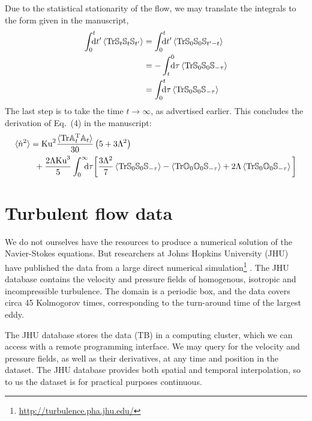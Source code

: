 \documentclass[thesis.tex]{subfiles}
\begin{document}
Due to the statistical stationarity of the flow, we may translate the integrals to the form given in the manuscript, 
\begin{align*}
	\int_0^{t}\!\!\!\!{\rm d}t'\left\langle\tr \ma S_t\ma S_{t}\ma S_{t'}\right\rangle 
	&= \int_0^{t}\!\!\!\!{\rm d}t'\left\langle\tr \ma S_0\ma S_{0}\ma S_{t'-t}\right\rangle \\
	&= -\int_t^{0}\!\!\!\!{\rm d}\tau\left\langle\tr \ma S_0\ma S_{0}\ma S_{-\tau}\right\rangle \\
	&= \int_0^{t}\!\!\!\!{\rm d}\tau\left\langle\tr \ma S_0\ma S_{0}\ma S_{-\tau}\right\rangle
\end{align*}
The last step is to take the time $t\to\infty$, as advertised earlier. This concludes the derivation of Eq.~(4) in the manuscript:
\begin{align}
\langle \dot n^2\rangle &=\ku^2\frac{\langle\tr\ma A_t\transpose \ma A_t\rangle}{30}\left(5 + 3 \Lambda^2\right) \nn \\
	&\,\,\,+ \frac{2 \Lambda\ku^3}{5} \int_0^{\infty}\!\!\!\!{\rm d}\tau \bigg[\frac{3 \Lambda^2}{7}\left\langle\tr \ma S_0\ma S_{0}\ma S_{-\tau}\right\rangle - \left\langle\tr \ma O_0\ma O_{0}\ma S_{-\tau}\right\rangle + 2 \Lambda\left\langle\tr \ma S_0\ma O_{0}\ma S_{-\tau}\right\rangle\bigg]\eqnlab{eq4final}
\end{align}


\section{Turbulent flow data}

We do not ourselves have the resources to produce a numerical solution of the Navier-Stokes equations. But researchers at Johns Hopkins University (JHU) have published the data from a large direct numerical simulation\footnote{\url{http://turbulence.pha.jhu.edu/}} \cite{li2008}. The JHU database contains the velocity and pressure fields of homogenous, isotropic and incompressible turbulence. The domain is a periodic box, and the data covers circa 45 Kolmogorov times, corresponding to the turn-around time of the largest eddy. 

The JHU database stores the data (\unit[27]{TB}) in a computing cluster, which we can access with a remote programming interface. We may query for the velocity and pressure fields, as well as their derivatives, at any time and position in the dataset. The JHU database provides both spatial and temporal interpolation, so to us the dataset is for practical purposes continuous.
\end{document}
